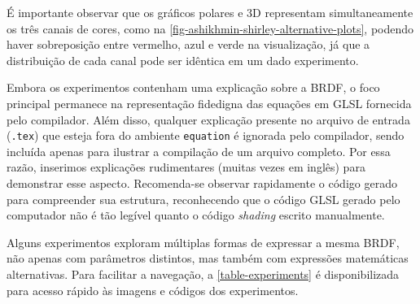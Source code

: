 É importante observar que os gráficos polares e 3D representam simultaneamente os três canais de cores, como na \autoref{fig-ashikhmin-shirley-alternative-plots}, podendo haver sobreposição entre vermelho, azul e verde na visualização, já que a distribuição de cada canal pode ser idêntica em um dado experimento.


Embora os experimentos contenham uma explicação sobre a BRDF, o foco principal permanece na representação fidedigna das equações em GLSL fornecida pelo compilador. Além disso, qualquer explicação presente no arquivo de entrada (\verb".tex") que esteja fora do ambiente \texttt{equation} é ignorada pelo compilador, sendo incluída apenas para ilustrar a compilação de um arquivo completo. Por essa razão, inserimos explicações rudimentares (muitas vezes em inglês) para demonstrar esse aspecto. Recomenda-se observar rapidamente o código gerado para compreender sua estrutura, reconhecendo que o código GLSL gerado pelo computador não é tão legível quanto o código \textit{shading} escrito manualmente.

Alguns experimentos exploram múltiplas formas de expressar a mesma BRDF, não apenas com parâmetros distintos, mas também com expressões matemáticas alternativas. Para facilitar a navegação, a \autoref{table-experiments} é disponibilizada para acesso rápido às imagens e códigos dos experimentos.



